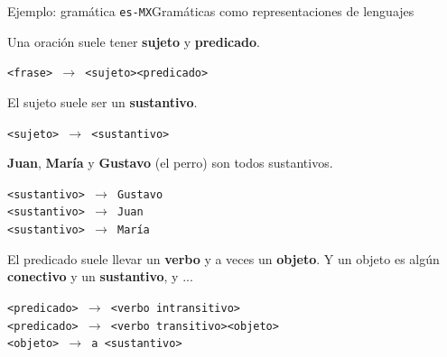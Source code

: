 \documentclass[spanish]{beamer}
\begin{document}
\begin{frame}{Ejemplo: gramática \texttt{es-MX}}{Gramáticas como representaciones de lenguajes}

    Una \alert{oración} suele tener \textbf{sujeto} y \textbf{predicado}. \pause

    {\large \texttt{<frase> $\to$ <sujeto><predicado>}} \pause

    \bigskip

    El \alert{sujeto} suele ser un \textbf{sustantivo}. \pause

    {\large \texttt{<sujeto> $\to$ <sustantivo>}} \pause

    \bigskip

    \textbf{Juan}, \textbf{María} y \textbf{Gustavo} (el perro) son todos \alert{sustantivos}. \pause

    {\large \texttt{<sustantivo> $\to$ Gustavo}}\\
    {\large \texttt{<sustantivo> $\to$ Juan}}\\
    {\large \texttt{<sustantivo> $\to$ María}} \pause

    \bigskip

    El \alert{predicado} suele llevar un \textbf{verbo} y a veces un \textbf{objeto}. Y un \alert{objeto} es algún \textbf{conectivo} y un \textbf{sustantivo}, y ... \pause

    {\large \texttt{<predicado> $\to$ <verbo intransitivo>}}\\
    {\large \texttt{<predicado> $\to$ <verbo transitivo><objeto>}}\\
    {\large \texttt{<objeto> $\to$ a <sustantivo>}}

\end{frame}
\end{document}
